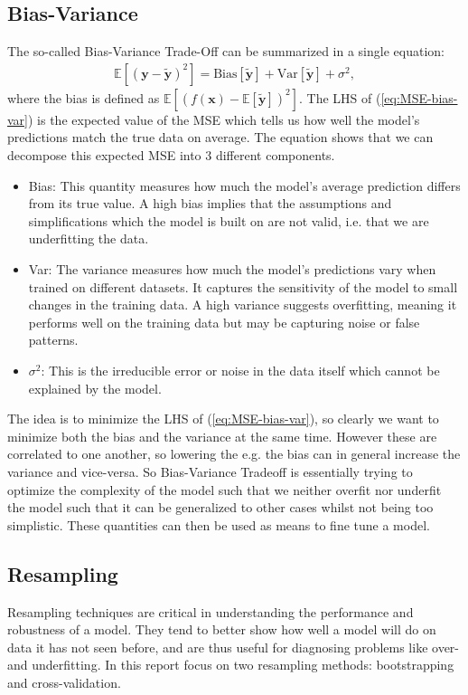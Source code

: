 \documentclass[%
reprint,
amsmath,amssymb,
aps,
pra,
]{revtex4-2}
\begin{document}
\subsection{Bias-Variance}
The so-called Bias-Variance Trade-Off can be summarized in a single equation:
\begin{align}
	\mathbb{E}[(\bm y-\tilde{\bm y})^2]=\text{Bias}[\tilde{\bm y}]+\text{Var}[\tilde{\bm y}]+\sigma^2,
	\label{eq:MSE-bias-var}
\end{align}
where the bias is defined as $\mathbb E[(f(\bm x)-\mathbb E[\tilde{\bm y}])^2]$. The LHS of (\ref{eq:MSE-bias-var}) is the expected value of the MSE which tells us how well the model's predictions match the true data on average. The equation shows that we can decompose this expected MSE into 3 different components.
\begin{itemize}
	\item Bias: This quantity measures how much the model's average prediction differs from its true value. A high bias implies that the assumptions and simplifications which the model is built on are not valid, i.e. that we are underfitting the data.
	\item Var: The variance measures how much the model's predictions vary when trained on different datasets. It captures the sensitivity of the model to small changes in the training data. A high variance suggests overfitting, meaning it performs well on the training data but may be capturing noise or false patterns.
	\item $\sigma^2$: This is the irreducible error or noise in the data itself which cannot be explained by the model.
\end{itemize}
The idea is to minimize the LHS of (\ref{eq:MSE-bias-var}), so clearly we want to minimize both the bias and the variance at the same time. However these are correlated to one another, so lowering the e.g. the bias can in general increase the variance and vice-versa. So Bias-Variance Tradeoff is essentially trying to optimize the complexity of the model such that we neither overfit nor underfit the model such that it can be generalized to other cases whilst not being too simplistic. These quantities can then be used as means to fine tune a model.

\subsection{Resampling}
Resampling techniques are critical in understanding the performance and robustness of a model. They tend to better show how well a model will do on data it has not seen before, and are thus useful for diagnosing problems like over- and underfitting. In this report focus on two resampling methods: bootstrapping and cross-validation.
\end{document}
